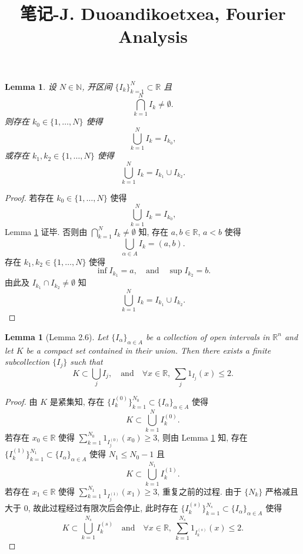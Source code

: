 \documentclass[a4paper,11pt]{article}
\title{笔记-J. Duoandikoetxea, Fourier Analysis}
\newtheorem{lemma}[theorem]{Lemma}
\theoremstyle{definition}
\begin{document}
\begin{CJK*}{UTF8}{gbsn}

\maketitle

\begin{lemma} \label{lem1}
    设 $ N \in \mathbb{N} $, 开区间 $ \{I_k\}_{k = 1}^N \subset \mathbb{R} $ 且
    $$
        \bigcap_{k = 1}^N I_k \neq \emptyset.
    $$
    则存在 $ k_0 \in \{1, \ldots, N\} $ 使得
    $$
        \bigcup_{k = 1}^N I_k = I_{k_0},
    $$
    或存在 $ k_1, k_2 \in \{1, \ldots, N\} $ 使得
    $$
        \bigcup_{k = 1}^N I_k = I_{k_1} \cup I_{k_2}.
    $$
\end{lemma}

\begin{proof}
    若存在 $ k_0 \in \{1, \ldots, N\} $ 使得
    $$
        \bigcup_{k = 1}^N I_k = I_{k_0},
    $$
    Lemma \ref{lem1} 证毕. 
    否则由 $ \bigcap_{k = 1}^N I_k \neq \emptyset $ 知, 
    存在 $ a, b \in \mathbb{R} $, $ a < b $ 使得
    $$
        \bigcup_{\alpha \in A} I_k = (a, b).
    $$
    存在 $ k_1, k_2 \in \{1, \ldots, N\} $ 使得
    $$
        \inf I_{k_1} = a, \quad \text{and} \quad \sup I_{k_2} = b.
    $$
    由此及 $ I_{k_1} \cap I_{k_2} \neq \emptyset $ 知
    $$
        \bigcup_{k = 1}^N I_k = I_{k_1} \cup I_{k_2}.
    $$
\end{proof}

\begin{lemma}[Lemma 2.6]
    Let $ \{ I_\alpha \}_{\alpha \in A} $ be a collection of open intervals in $ \mathbb{R}^n $ 
    and let $ K $ be a compact set contained in their union. Then there exists a finite subcollection
    $ \{ I_j \} $ such that
    $$
        K \subset \bigcup_j I_j, \quad \text{and} \quad 
        \forall x \in \mathbb{R},\ \sum_j \mathrm{1}_{I_j} (x) \leq 2.
    $$
\end{lemma}

\begin{proof}
    由 $ K $ 是紧集知, 存在 $ \{I_k^{(0)}\}_{k = 1}^{N_0} \subset \{ I_\alpha \}_{\alpha \in A} $ 使得
    $$
        K \subset \bigcup_{k = 1}^N I_k^{(0)}.
    $$
    若存在 $ x_0 \in \mathbb{R} $ 使得 $ \sum_{k = 1}^{N_0} \mathrm{1}_{I_j^{(0)}} (x_0) \geq 3 $, 
    则由 Lemma \ref{lem1} 知,
    存在 $ \{I_k^{(1)}\}_{k = 1}^{N_1} \subset \{ I_\alpha \}_{\alpha \in A} $ 使得 $ N_1 \leq N_0 - 1 $ 且
    $$
        K \subset \bigcup_{k = 1}^{N_1} I_k^{(1)}.
    $$
    若存在 $ x_1 \in \mathbb{R} $ 使得 $ \sum_{k = 1}^{N_1} \mathrm{1}_{I_j^{(1)}} (x_1) \geq 3 $, 重复之前的过程.
    由于 $ \{N_k\} $ 严格减且大于 $ 0 $,
    故此过程经过有限次后会停止, 此时存在 $ \{I_k^{(s)}\}_{k = 1}^{N_s} \subset \{ I_\alpha \}_{\alpha \in A} $ 使得
    $$
        K \subset \bigcup_{k = 1}^{N_s} I_k^{(s)} \quad \text{and} \quad 
        \forall x \in \mathbb{R},\ \sum_{k = 1}^{N_s} \mathrm{1}_{I_k^{(s)}} (x) \leq 2.
    $$
\end{proof}


\end{CJK*}
\end{document}
